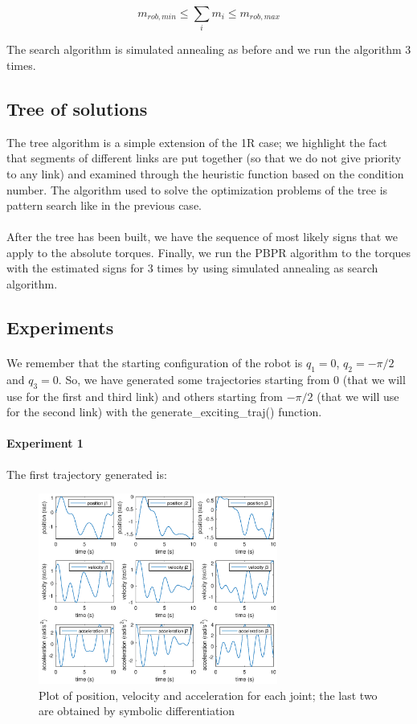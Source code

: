 \documentclass{article}
\begin{document}
\[m_{rob,min}\le \sum_i{m_i} \le m_{rob,max}\]

The search algorithm is simulated annealing as before and we run the algorithm 3 times.

\subsection{Tree of solutions}
The tree algorithm is a simple extension of the 1R case; we highlight the fact that segments of different links are put together (so that we do not give priority to any link) and examined through the heuristic function based on the condition number. The algorithm used to solve the optimization problems of the tree is pattern search like in the previous case.
\\\\
After the tree has been built, we have the sequence of most likely signs that we apply to the absolute torques. Finally, we run the PBPR algorithm to the torques with the estimated signs for 3 times by using simulated annealing as search algorithm.

\subsection{Experiments}
\paragraph{}We remember that the starting configuration of the robot is $q_1 = 0$, $q_2 = -\pi/2$ and $q_3 = 0$. So, we have generated some trajectories starting from 0 (that we will use for the first and third link) and others starting from $-\pi/2$ (that we will use for the second link) with the generate\_exciting\_traj() function.

\paragraph{Experiment 1}
The first trajectory generated is:
\begin{figure}[!htbp]
\centering
\includegraphics[width=0.7\textwidth]{images/3-dof/trajectory123.eps}
\caption{Plot of position, velocity and acceleration for each joint; the last two are obtained by symbolic differentiation}
\end{figure}
\FloatBarrier
\end{document}
